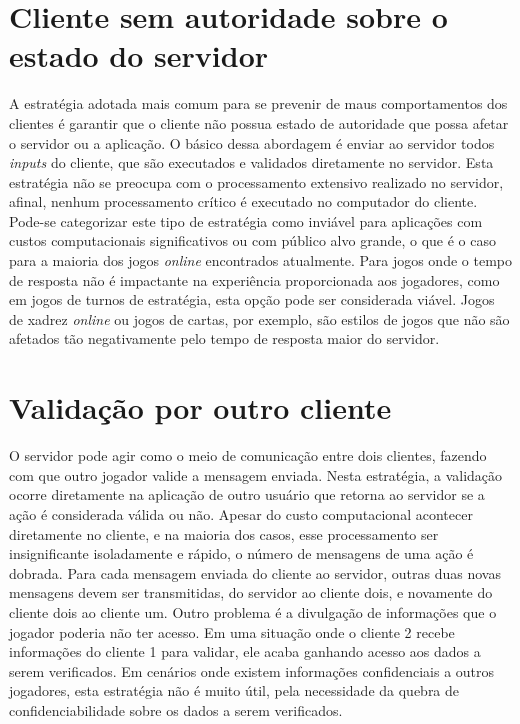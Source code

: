 \section{Cliente sem autoridade sobre o estado do servidor}
A estratégia adotada mais comum para se prevenir de maus comportamentos dos clientes é garantir que o cliente não possua estado de autoridade que possa afetar o servidor ou a aplicação. O básico dessa abordagem é enviar ao servidor todos \textit{inputs} do cliente, que são executados e validados diretamente no servidor. Esta estratégia não se preocupa com o processamento extensivo realizado no servidor, afinal, nenhum processamento crítico é executado no computador do cliente. Pode-se categorizar este tipo de estratégia como inviável para aplicações com custos computacionais significativos ou com público alvo grande, o que é o caso para a maioria dos jogos \textit{online} encontrados atualmente. Para jogos onde o tempo de resposta não é impactante na experiência proporcionada aos jogadores, como em jogos de turnos de estratégia, esta opção pode ser considerada viável. Jogos de xadrez \textit{online} ou jogos de cartas, por exemplo, são estilos de jogos que não são afetados tão negativamente pelo tempo de resposta maior do servidor. 

\section{Validação por outro cliente}

O servidor pode agir como o meio de comunicação entre dois clientes, fazendo com que outro jogador valide a mensagem enviada. Nesta estratégia, a validação ocorre diretamente na aplicação de outro usuário que retorna ao servidor se a ação é considerada válida ou não. Apesar do custo computacional acontecer diretamente no cliente, e na maioria dos casos, esse processamento ser insignificante isoladamente e rápido, o número de mensagens de uma ação é dobrada. Para cada mensagem enviada do cliente ao servidor, outras duas novas mensagens devem ser transmitidas, do servidor ao cliente dois, e novamente do cliente dois ao cliente um. Outro problema é a divulgação de informações que o jogador poderia não ter acesso. Em uma situação onde o cliente 2 recebe informações do cliente 1 para validar, ele acaba ganhando acesso aos dados a serem verificados. Em cenários onde existem informações confidenciais a outros jogadores, esta estratégia não é muito útil, pela necessidade da quebra de confidenciabilidade sobre os dados a serem verificados.


